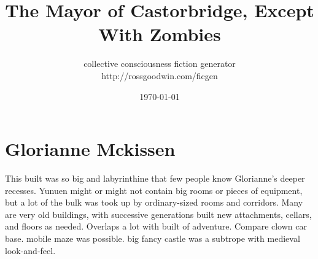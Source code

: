 \documentclass[12pt]{book}
\title{The Mayor of Castorbridge, Except With Zombies}
\author{collective consciousness fiction generator\\http://rossgoodwin.com/ficgen}
\date{\today}
\begin{document}
\maketitle



\chapter{Glorianne Mckissen}

This built was so big and labyrinthine that few people know Glorianne's deeper recesses. Yunuen might or might not contain big rooms or pieces of equipment, but a lot of the bulk was took up by ordinary-sized rooms and corridors. Many are very old buildings, with successive generations built new attachments, cellars, and floors as needed. Overlaps a lot with built of adventure. Compare clown car base. mobile maze was possible. big fancy castle was a subtrope with medieval look-and-feel.
\end{document}
